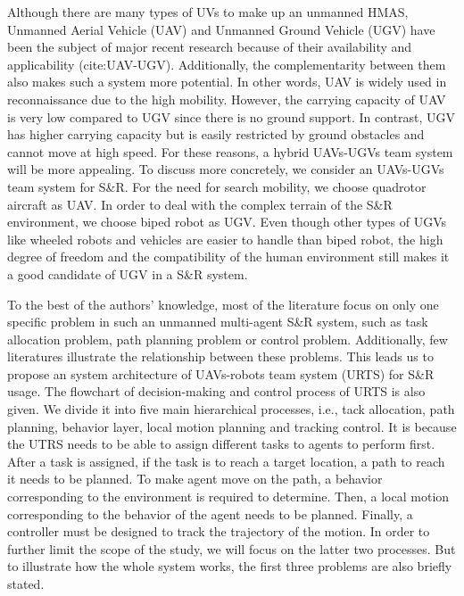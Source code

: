 \documentclass{ieeeaccess}
\begin{document}
Although there are many types of UVs to make up an unmanned HMAS, Unmanned Aerial Vehicle (UAV) and Unmanned Ground Vehicle (UGV) have been the subject of major recent research because of their availability and applicability (cite:UAV-UGV). Additionally, the complementarity between them also makes such a system more potential. In other words, UAV is widely used in reconnaissance due to the high mobility. However, the carrying capacity of UAV is very low compared to UGV since there is no ground support. In contrast, UGV has higher carrying capacity but is easily restricted by ground obstacles and cannot move at high speed. For these reasons, a hybrid UAVs-UGVs team system will be more appealing. To discuss more concretely, we consider an UAVs-UGVs team system for S\&R. For the need for search mobility, we choose quadrotor aircraft as UAV. In order to deal with the complex terrain of the S\&R environment, we choose biped robot as UGV. Even though other types of UGVs like wheeled robots and vehicles are easier to handle than biped robot, the high degree of freedom and the compatibility of the human environment still makes it a good candidate of UGV in a S\&R system.

To the best of the authors' knowledge, most of the literature focus on only one specific problem in such an unmanned multi-agent S\&R system, such as task allocation problem, path planning problem or control problem. Additionally, few literatures illustrate the relationship between these problems. This leads us to propose an system architecture of UAVs-robots team system (URTS) for S\&R usage. The flowchart of decision-making and control process of URTS is also given. We divide it into five main hierarchical processes, i.e., tack allocation, path planning, behavior layer, local motion planning and tracking control. It is because the UTRS needs to be able to assign different tasks to agents to perform first. After a task is assigned, if the task is to reach a target location, a path to reach it needs to be planned. To make agent move on the path, a behavior corresponding to the environment is required to determine. Then, a local motion corresponding to the behavior of the agent needs to be planned. Finally, a controller must be designed to track the trajectory of the motion. In order to further limit the scope of the study, we will focus on the latter two processes. But to illustrate how the whole system works, the first three problems are also briefly stated.
\end{document}
